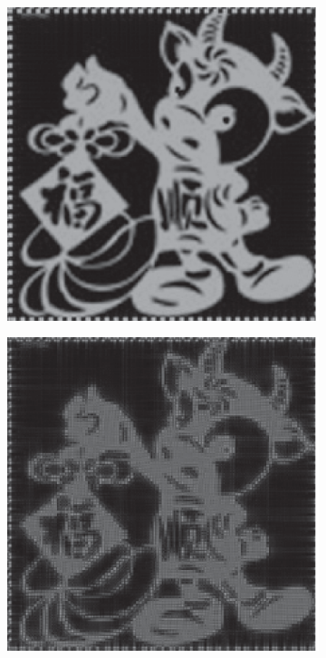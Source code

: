 \documentclass[10pt,letterpaper]{article}
\begin{document}
\begin{figure}[htbp]
  \centering
  \captionsetup[subfigure]{justification=centering}
  \begin{subfigure}[b]{0.24\linewidth}
  \centering
  \includegraphics[width=1\columnwidth]{14-a}
  \caption{}
  \end{subfigure}
  \begin{subfigure}[b]{0.24\linewidth}
  \includegraphics[width=1\columnwidth]{14-b}
  \centering
  \caption{}
  \end{subfigure}


\end{figure}
\end{document}
